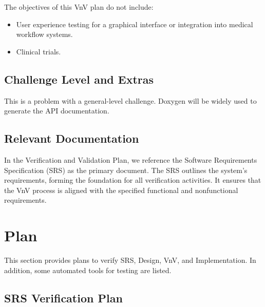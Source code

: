 \documentclass[12pt, titlepage]{article}
\begin{document}
\noindent The objectives of this VnV plan do not include:

\begin{itemize}
  \item User experience testing for a graphical interface or integration into
  medical workflow systems.
  \item Clinical trials.
\end{itemize}

\subsection{Challenge Level and Extras}

This is a problem with a general-level challenge. Doxygen will be widely used to
generate the API documentation.

\subsection{Relevant Documentation}

In the Verification and Validation Plan, we reference the Software Requirements
Specification (SRS) \citep{SRS} as the primary document. The SRS outlines the
system’s requirements, forming the foundation for all verification activities.
It ensures that the VnV process is aligned with the specified functional and
nonfunctional requirements.

\section{Plan}

This section provides plans to verify SRS, Design, VnV, and Implementation. In
addition, some automated tools for testing are listed.




\subsection{SRS Verification Plan}
\end{document}
